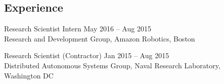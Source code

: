 \documentclass[line,margin]{cv}
\begin{document}
\begin{resume}
%
%

\section{Experience}

%
%
%

Research Scientist Intern
\hfill May 2016 -- Aug 2015 \\
Research and Development Group, Amazon Robotics, Boston


Research Scientist (Contractor)
\hfill Jan 2015 -- Aug 2015 \\
Distributed Autonomous Systems Group, Naval Research Laboratory, Washington DC

%
%

%
%
%


\end{resume}
\end{document}
